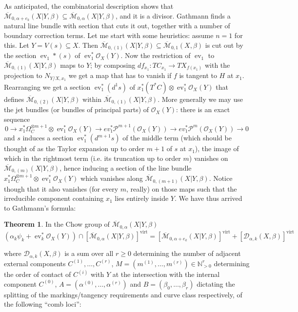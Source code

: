 \documentclass[11pt]{amsart}
\newcommand{\M}[4]{\overline{\mathcal{M}}_{#1,#2}(#3,#4)}
\newcommand{\N}{\mathbb{N}}
\newcommand{\OO}{\mathcal{O}}
\renewcommand{\to}{\rightarrow}
\newcommand{\virt}[1]{[#1]^{\operatorname{virt}}}
\newcommand{\ev}{\operatorname{ev}}
\theoremstyle{definition}
\newtheorem{thm}{Theorem}[section]
\theoremstyle{definition}
\begin{document}
As anticipated, the combinatorial description shows that $\M{0}{\alpha+e_k}{X|Y}{\beta}\subseteq \M{0}{\alpha}{X|Y}{\beta}$, and it is a divisor. Gathmann finds a natural line bundle with section that cuts it out, together with a number of boundary correction terms. Let me start with some heuristics: assume $n=1$ for this. Let $Y=V(s)\subseteq X$. Then $\M{0}{(1)}{X|Y}{\beta}\subseteq \M{0}{1}{X}{\beta}$ is cut out by the section $\ev_1*(s)$ of $\ev_1^*\OO_X(Y)$. Now the restriction of $\ev_1$ to $\M{0}{(1)}{X|Y}{\beta}$ maps to $Y$; by composing $df_{x_1}\colon TC_{x_1}\to TX_{f(x_1)}$ with the projection to $N_{Y/X,x_1}$ we get a map that has to vanish if $f$ is tangent to $H$ at $x_1$. Rearranging we get a section $\ev_1^*(d^1s)$ of $x_1^*(T^*C)\otimes\ev_1^*\OO_X(Y)$ that defines $\M{0}{(2)}{X|Y}{\beta}$ within $\M{0}{(1)}{X|Y}{\beta}$. More generally we may use the jet bundles (or bundles of principal parts) of $\OO_X(Y)$: there is an exact sequence
\[ 0\to x_1^*\Omega_{C}^{\otimes m+1}\otimes\ev_1^*\OO_X(Y)\to ev_1^*\mathcal P^{m+1}(\OO_X(Y))\to ev_1^*\mathcal P^{m}(\OO_X(Y))\to 0\]
and $s$ induces a section $\ev_1^*(d^{m+1}s)$ of the middle term (which should be thought of as the Taylor expansion up to order $m+1$ of $s$ at $x_1$), the image of which in the rightmost term (i.e. its truncation up to order $m$) vanishes on $\M{0}{(m)}{X|Y}{\beta}$, hence inducing a section of the line bundle $x_1^*\Omega_{C}^{\otimes m+1}\otimes\ev_1^*\OO_X(Y)$ which vanishes along $\M{0}{(m+1)}{X|Y}{\beta}$. Notice though that it also vanishes (for every $m$, really) on those maps such that the irreducible component containing $x_1$ lies entirely inside $Y$. We have thus arrived to Gathmann's formula:
\begin{thm}\cite[Theorem 2.6]{Ga}\label{thm:Gathmann_formula} In the Chow group of $\M{0}{\alpha}{X|Y}{\beta}$
 \begin{equation*} (\alpha_k \psi_k + \ev_k^* \OO_X(Y)) \cap \virt{\M{0}{\alpha}{X|Y}{\beta}} = \virt{\M{0}{\alpha+e_k}{X|Y}{\beta}} + \virt{\mathcal{D}_{\alpha,k}(X,\beta)} \end{equation*}
\end{thm}
where $\mathcal{D}_{\alpha,k}(X,\beta)$ is a sum over all $r\geq 0$ determining the number of adjacent external components $C^{(1)},\ldots,C^{(r)}$, $M=(m^{(1)},\ldots,m^{(r)})\in \N^r_{>0}$ determining the order of contact of $C^{(i)}$ with $Y$ at the intersection with the internal component $C^{(0)}$, $A=(\alpha^{(0)},\ldots,\alpha^{(r)})$ and $B=(\beta_0,\ldots,\beta_r)$ dictating the splitting of the markings/tangency requirements and curve class respectively, of the following ``comb loci'':
\end{document}
